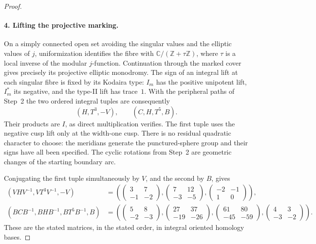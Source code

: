 \begin{proof}
\paragraph{4. Lifting the projective marking.}
On a simply connected open set avoiding the singular values and
the elliptic values of $j$, uniformization identifies the fibre
with $\mathbb C/(\mathbb Z+\tau\mathbb Z)$, where $\tau$ is a
local inverse of the modular $j$-function.  Continuation through
the marked cover gives precisely its projective elliptic
monodromy.  The sign of an integral lift at each singular fibre
is fixed by its Kodaira type: $I_m$ has the positive unipotent
lift, $I_m^*$ its negative, and the type-II lift has trace~$1$.
With the peripheral paths of Step~2 the two ordered integral
tuples are consequently
\[
 (H,T^3,-V),\qquad (C,H,T^5,B).
\]
Their products are $I$, as direct multiplication verifies.  The
first tuple uses the negative cusp lift only at the width-one
cusp.  There is no residual quadratic character to choose: the
meridians generate the punctured-sphere group and their signs
have all been specified.  The cyclic rotations from Step~2
are geometric changes of the starting boundary arc.

Conjugating the first tuple simultaneously by $V$, and the second
by $B$, gives
\[
\begin{split}
 (VHV^{-1},VT^3V^{-1},-V)
 &=\left(
 \begin{pmatrix}3&7\\-1&-2\end{pmatrix},
 \begin{pmatrix}7&12\\-3&-5\end{pmatrix},
 \begin{pmatrix}-2&-1\\1&0\end{pmatrix}\right),\\
 (BCB^{-1},BHB^{-1},BT^5B^{-1},B)
 &=\left(
 \begin{pmatrix}5&8\\-2&-3\end{pmatrix},
 \begin{pmatrix}27&37\\-19&-26\end{pmatrix},
 \begin{pmatrix}61&80\\-45&-59\end{pmatrix},
 \begin{pmatrix}4&3\\-3&-2\end{pmatrix}\right).
\end{split}
\]
These are the stated matrices, in the stated order, in integral
oriented homology bases.


\end{proof}
